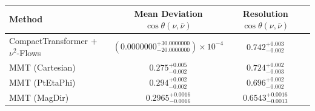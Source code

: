     \begin{tabular}{lccc}
        \toprule
        Method & Mean Deviation $\cos\theta(\nu, \bar{\nu})$ & Resolution $\cos\theta(\nu, \bar{\nu})$ \\
        \midrule
        CompactTransformer + $\nu^2$-Flows & $(0.0000000^{+30.0000000}_{-20.0000000})\times 10^{-4}$ & $0.742^{+0.003}_{-0.002}$ \\
        MMT (Cartesian) & $0.275^{+0.005}_{-0.002}$ & $0.724^{+0.002}_{-0.003}$ \\
        MMT (PtEtaPhi) & $0.294^{+0.002}_{-0.002}$ & $0.696^{+0.002}_{-0.002}$ \\
        MMT (MagDir) & $0.2965^{+0.0016}_{-0.0016}$ & $0.6543^{+0.0016}_{-0.0013}$ \\
        \bottomrule
    \end{tabular}